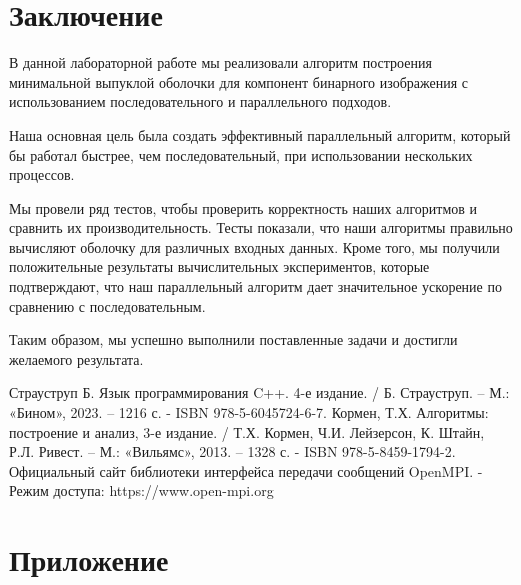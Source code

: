 \documentclass[a4paper, 12pt]{extarticle}
\newcommand{\n}{\par}
\begin{document}
	\section{Заключение}
	В данной лабораторной работе мы реализовали алгоритм построения минимальной выпуклой оболочки для компонент бинарного изображения с использованием последовательного и параллельного подходов.\n
	Наша основная цель была создать эффективный параллельный алгоритм, который бы работал быстрее, чем последовательный, при использовании нескольких процессов.\n
	Мы провели ряд тестов, чтобы проверить корректность наших алгоритмов и сравнить их производительность. Тесты показали, что наши алгоритмы правильно вычисляют оболочку для различных входных данных. Кроме того, мы получили положительные результаты вычислительных экспериментов, которые подтверждают, что наш параллельный алгоритм дает значительное ускорение по сравнению с последовательным.\n
	Таким образом, мы успешно выполнили поставленные задачи и достигли желаемого результата.
	\newpage
	\begin{thebibliography}{3}
		Страуструп Б. Язык программирования C++. 4-е издание. / Б. Страуструп. – М.: «Бином», 2023. – 1216 с. - ISBN 978-5-6045724-6-7.
		Кормен, Т.Х. Алгоритмы: построение и анализ, 3-е издание. / Т.Х. Кормен, Ч.И. Лейзерсон, К. Штайн, Р.Л. Ривест. – М.: «Вильямс», 2013. – 1328 с. - ISBN 978-5-8459-1794-2.
		Официальный сайт библиотеки интерфейса передачи сообщений OpenMPI. - Режим доступа: https://www.open-mpi.org
	\end{thebibliography}
	\newpage
	\section*{Приложение}
\end{document}
